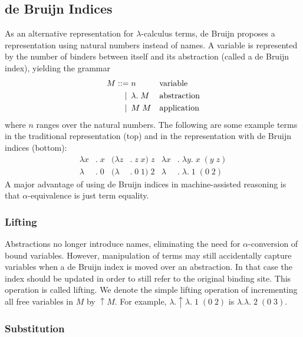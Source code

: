 \documentclass[a4paper,11pt]{article}
\begin{document}
\subsection{de Bruijn Indices}

As an alternative representation for $\lambda$-calculus terms, de Bruijn
\cite{deBruijn-72} proposes a representation using natural numbers instead
of names.
A variable is represented by the number of binders between itself and its
abstraction (called a de Bruijn index), yielding the grammar
\begin{align*}
  M ::=             &\; n
  && \text{variable} \\
  \llap{\textbar\:} &\; \lambda . \; M
  && \text{abstraction} \\
  \llap{\textbar\:} &\; M \; M
  && \text{application}
\end{align*}
where $n$ ranges over the natural numbers.
The following are some example terms in the traditional representation
(top) and in the representation with de Bruijn indices (bottom):
\begin{align*}
  \lambda x&. \; x & (\lambda z&. \; z \; x) \; z & \lambda x&. \; \lambda y. \; x \; (y \; z)\\
  \lambda &. \; 0  & (\lambda &. \; 0 \; 1) \; 2  & \lambda &. \; \lambda . \; 1 \; (0 \; 2)
\end{align*}
A major advantage of using de Bruijn indices in machine-assisted
reasoning is that $\alpha$-equivalence is just term equality.

\subsubsection*{Lifting}

Abstractions no longer introduce names, eliminating the need for
$\alpha$-conversion of bound variables.
However, manipulation of terms may still accidentally capture
variables when a de Bruijn index is moved over an abstraction.
In that case the index should be updated in order to still refer to the
original binding site.
This operation is called lifting. We denote the simple lifting operation
of incrementing all free variables in $M$ by $\uparrow \! M$. For
example, $\lambda . \uparrow \! \lambda . \; 1 \; (0 \; 2)$ is
$\lambda . \lambda . \; 2 \; (0 \; 3)$.

\subsubsection*{Substitution}
\end{document}
